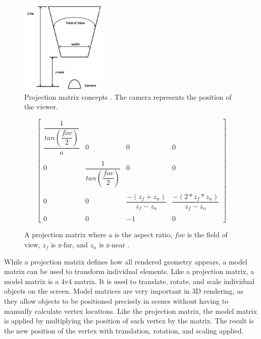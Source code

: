 \documentclass{article}
\begin{document}
\begin{figure}[h]
	\centering
	\includegraphics[height=4.5cm]{projection-matrix}
	\caption{Projection matrix concepts \cite{hernandez2019}. The camera represents the position of the viewer.}
	\label{fig:projection}
\end{figure}

\begin{figure}[h]
    \[
	  \begin{bmatrix}
        \dfrac{\dfrac{1}{tan(\dfrac{\mathit{fov}}{2})}}{a} &
        0 &
        0 &
        0 \\ \\
        0 &
        \dfrac{1}{tan(\dfrac{\mathit{fov}}{2})} &
        0 &
        0 \\ \\
        0 &
        0 &
        \dfrac{-(z_f + z_n)}{z_f - z_n} &
        \dfrac{-(2 * z_f * z_n)}{z_f - z_n} \\ \\
        0 &
        0 &
        -1 &
        0
      \end{bmatrix}
    \]
    \caption{A projection matrix where a is the aspect ratio, $\mathit{fov}$ is the field of view, $z_f$ is z-far, and $z_n$ is z-near \cite{hernandez2019}.}
    \label{fig:matrix}
\end{figure}

While a projection matrix defines how all rendered geometry appears, a model matrix can be used to transform individual elements. Like a projection matrix, a model matrix is a 4v4 matrix. It is used to translate, rotate, and scale individual objects on the screen. Model matrices are very important in 3D rendering, as they allow objects to be positioned precisely in scenes without having to manually calculate vertex locations. Like the projection matrix, the model matrix is applied by multiplying the position of each vertex by the matrix. The result is the new position of the vertex with translation, rotation, and scaling applied.
\end{document}
